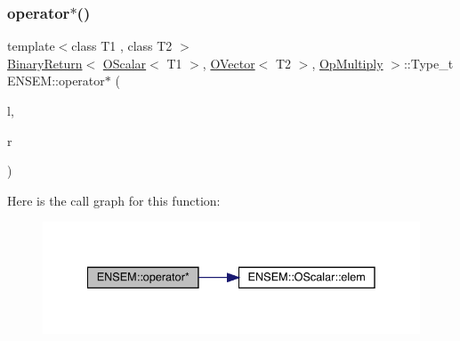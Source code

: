 \mbox{\label{group__obsvector_ga8b90f37dfc2d857d5ba547b2639cc97e}} 
\subsubsection{\texorpdfstring{operator$\ast$()}{operator*()}\hspace{0.1cm}{\footnotesize\ttfamily [2/8]}}
{\footnotesize\ttfamily template$<$class T1 , class T2 $>$ \\
\mbox{\hyperlink{structENSEM_1_1BinaryReturn}{Binary\+Return}}$<$ \mbox{\hyperlink{classENSEM_1_1OScalar}{O\+Scalar}}$<$ T1 $>$, \mbox{\hyperlink{classENSEM_1_1OVector}{O\+Vector}}$<$ T2 $>$, \mbox{\hyperlink{structENSEM_1_1OpMultiply}{Op\+Multiply}} $>$\+::Type\+\_\+t E\+N\+S\+E\+M\+::operator$\ast$ (\begin{DoxyParamCaption}\item[{const \mbox{\hyperlink{classENSEM_1_1OScalar}{O\+Scalar}}$<$ T1 $>$ \&}]{l,  }\item[{const \mbox{\hyperlink{classENSEM_1_1OVector}{O\+Vector}}$<$ T2 $>$ \&}]{r }\end{DoxyParamCaption})\hspace{0.3cm}{\ttfamily [inline]}}

Here is the call graph for this function\+:\nopagebreak
\begin{figure}[H]
\begin{center}
\leavevmode
\includegraphics[width=335pt]{da/d59/group__obsvector_ga8b90f37dfc2d857d5ba547b2639cc97e_cgraph}
\end{center}
\end{figure}
\mbox{\label{group__obsvector_gabb4c9b103a03a23a7cc8db755ded0b7c}} 
